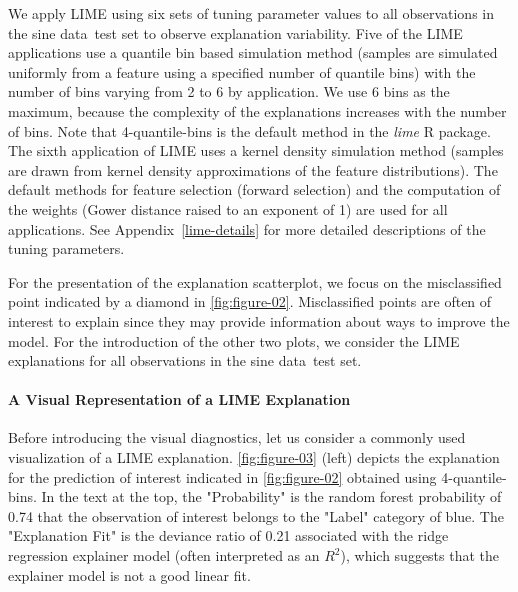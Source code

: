 \documentclass[AMS,STIX2COL]{WileyNJD-v2}\usepackage[]{graphicx}\usepackage[]{color}
\newcommand{\data}{sine data}
\begin{document}
We apply LIME using six sets of tuning parameter values to all observations in the \data \ test set to observe explanation variability. Five of the LIME applications use a  quantile bin based simulation method (samples are simulated uniformly from a feature using a specified number of quantile bins)  with the number of bins varying from 2 to 6 by application. We use 6 bins as the maximum, because the complexity of the explanations increases with the number of bins. Note that 4-quantile-bins is  the default method in the \emph{lime} R package. The sixth application of LIME uses a kernel density simulation method (samples are drawn from kernel density approximations of the feature distributions). The default methods for feature selection (forward selection) and the computation of the weights (Gower distance raised to an exponent of 1) are used for all applications. See Appendix~\ref{lime-details} for more detailed descriptions of the tuning parameters.

For the presentation of the explanation scatterplot, we focus on the misclassified point  indicated by a diamond in \autoref{fig:figure-02}. Misclassified points are often of interest to explain since they may provide information about ways to improve the model. For the introduction of the other two  plots, we consider the LIME explanations for  all observations in the \data \ test set.

\paragraph{A Visual Representation of a LIME Explanation}

Before introducing the visual diagnostics, let us consider a commonly used visualization of a LIME explanation. \autoref{fig:figure-03} (left) depicts the explanation for the prediction of interest indicated in \autoref{fig:figure-02} obtained using 4-quantile-bins. In the text at the top, the "Probability" is the random forest probability of 0.74 that the observation of interest belongs to the "Label" category of blue. The "Explanation Fit" is the deviance ratio of 0.21 associated with the ridge regression explainer model (often interpreted as an $R^2$), which suggests that the explainer model is not a good linear fit.
\end{document}
